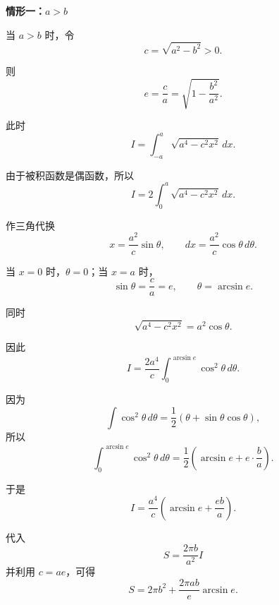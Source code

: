 \begin{proofbox}
\begin{description}[style=nextline, leftmargin=2.8em, labelsep=0.5em, itemsep=0.55em]
	\end{description}

	\medskip

	\textbf{\textcolor{CProof}{情形一：$a>b$}}

	\begin{description}[style=nextline, leftmargin=2.8em, labelsep=0.5em, itemsep=0.55em]

		\item[\textbf{步骤四（三角代换）：}]
		      当 $a>b$ 时，令
		      \[
			      c=\sqrt{a^{2}-b^{2}}>0.
		      \]

		      则
		      \[
			      e=\frac{c}{a}
			      =
			      \sqrt{1-\frac{b^{2}}{a^{2}}}.
		      \]

		      此时
		      \[
			      I
			      =
			      \int_{-a}^{a}
			      \sqrt{a^{4}-c^{2}x^{2}}\,dx.
		      \]

		      由于被积函数是偶函数，所以
		      \[
			      I
			      =
			      2\int_{0}^{a}
			      \sqrt{a^{4}-c^{2}x^{2}}\,dx.
		      \]

		      作三角代换
		      \[
			      x=\frac{a^{2}}{c}\sin\theta,
			      \qquad
			      dx=\frac{a^{2}}{c}\cos\theta\,d\theta.
		      \]

		      当 $x=0$ 时，$\theta=0$；当 $x=a$ 时，
		      \[
			      \sin\theta=\frac{c}{a}=e,
			      \qquad
			      \theta=\arcsin e.
		      \]

		      同时
		      \[
			      \sqrt{a^{4}-c^{2}x^{2}}
			      =
			      a^{2}\cos\theta.
		      \]

		      因此
		      \[
			      I
			      =
			      \frac{2a^{4}}{c}
			      \int_{0}^{\arcsin e}
			      \cos^{2}\theta\,d\theta.
		      \]

		\item[\textbf{步骤五（积分回代）：}]
		      因为
		      \[
			      \int \cos^{2}\theta\,d\theta
			      =
			      \frac12(\theta+\sin\theta\cos\theta),
		      \]
		      所以
		      \[
			      \int_{0}^{\arcsin e}
			      \cos^{2}\theta\,d\theta
			      =
			      \frac12
			      \left(
			      \arcsin e
			      +
			      e\cdot \frac{b}{a}
			      \right).
		      \]

		      于是
		      \[
			      I
			      =
			      \frac{a^{4}}{c}
			      \left(
			      \arcsin e+\frac{eb}{a}
			      \right).
		      \]

		      代入
		      \[
			      S=\frac{2\pi b}{a^{2}}I
		      \]
		      并利用 $c=ae$，可得
		      \[
			      S
			      =
			      2\pi b^{2}
			      +
			      \frac{2\pi ab}{e}\arcsin e.
		      \]


\end{description}
\end{proofbox}
